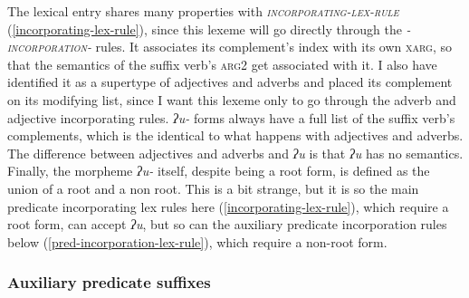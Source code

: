 \ex \label{uu-lex}
\xe

The lexical entry shares many properties with \textit{\textsc{incorporating-lex-rule}} (\ref{incorporating-lex-rule}), since this lexeme will go directly through the \textsc{\textit{-incorporation-}} rules. It associates its complement's index with its own \textsc{xarg}, so that the semantics of the suffix verb's \textsc{arg2} get associated with it. I also have identified it as a supertype of adjectives and adverbs and placed its complement on its modifying list, since I want this lexeme only to go through the adverb and adjective incorporating rules. \textit{ʔu-} forms always have a full list of the suffix verb's complements, which is the identical to what happens with adjectives and adverbs. The difference between adjectives and adverbs and \textit{ʔu} is that \textit{ʔu} has no semantics. Finally, the morpheme \textit{ʔu-} itself, despite being a root form, is defined as the union of a root and a non root. This is a bit strange, but it is so the main predicate incorporating lex rules here (\ref{incorporating-lex-rule}), which require a root form, can accept \textit{ʔu}, but so can the auxiliary predicate incorporation rules below (\ref{pred-incorporation-lex-rule}), which require a non-root form.


\subsubsection{Auxiliary predicate suffixes} \label{ch:clause:analysis:auxpred}

